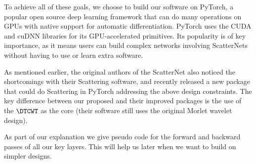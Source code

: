To achieve all of these goals, we choose to build our software on PyTorch, 
a popular open source deep learning framework that can do many operations on
GPUs with native support for automatic differentiation. PyTorch uses the CUDA 
and cuDNN \cite{} libraries for its GPU-accelerated primitives. Its popularity
is of key importance, as it means users can build complex networks involving
ScatterNets without having to use or learn extra software.

As mentioned earlier, the original authors of the ScatterNet also noticed the
shortcomings with their Scattering software, and recently released a new package
that could do Scattering in PyTorch \cite{kymatio} addressing the above design
constraints. The key difference between our proposed and their
improved packages is the use of the $\DTCWT$ as the core (their software still
uses the original Morlet wavelet design).

As part of our explanation we give pseudo code for the forward and backward
passes of all our key layers. This will help us later when we want to build on
simpler designs.
